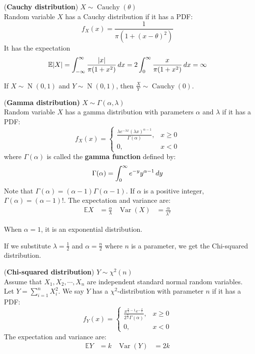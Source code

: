 \documentclass{huhtakm-template-book}
\newcommand{\expect}{\mathbb{E}}
\DeclareMathOperator{\N}{N}
\DeclareMathOperator{\Cauchy}{Cauchy}
\DeclareMathOperator{\Var}{Var}
\begin{document}
\newpage
\begin{eg}(\textbf{Cauchy distribution}) $X\sim\Cauchy(\theta)$\\
	Random variable $X$ has a Cauchy distribution if it has a PDF:
	\begin{equation*}
		f_{X}(x)=\frac{1}{\pi(1+(x-\theta)^{2})}
	\end{equation*}
	It has the expectation
	\begin{equation*}
		\expect|X|=\intinfty\frac{|x|}{\pi(1+x^{2})}\,dx=2\intlu{0}{\infty}\frac{x}{\pi(1+x^{2})}\,dx=\infty
	\end{equation*}
\end{eg}
\begin{rem}
	If $X\sim\N(0,1)$ and $Y\sim\N(0,1)$, then $\frac{X}{Y}\sim\Cauchy(0)$.
\end{rem}
\begin{eg}(\textbf{Gamma distribution)} $X\sim\Gamma(\alpha,\lambda)$\\
	Random variable $X$ has a gamma distribution with parameters $\alpha$ and $\lambda$ if it has a PDF:
	\begin{equation*}
		f_{X}(x)=\begin{cases}
			\frac{\lambda e^{-\lambda x}(\lambda x)^{\alpha-1}}{\Gamma(\alpha)}, &x\geq 0\\
			0, &x<0
		\end{cases}
	\end{equation*}
	where $\Gamma(\alpha)$ is called the \textbf{gamma function} defined by:
	\begin{equation*}
		\Gamma(\alpha)=\int_{0}^{\infty}e^{-y}y^{\alpha-1}\,dy
	\end{equation*}
	Note that $\Gamma(\alpha)=(\alpha-1)\Gamma(\alpha-1)$. If $\alpha$ is a positive integer, $\Gamma(\alpha)=(\alpha-1)!$. The expectation and variance are:
	\begin{align*}
		\expect{X}&=\frac{\alpha}{\lambda} & \Var(X)&=\frac{\alpha}{\lambda^{2}}
	\end{align*}
\end{eg}
\begin{rem}
	When $\alpha=1$, it is an exponential distribution.
\end{rem}
If we substitute $\lambda=\frac{1}{2}$ and $\alpha=\frac{n}{2}$ where $n$ is a parameter, we get the Chi-squared distribution.
\begin{eg}(\textbf{Chi-squared distribution}) $Y\sim\chi^{2}(n)$\\
	Assume that $X_{1},X_{2},\cdots,X_{n}$ are independent standard normal random variables. Let $Y=\sum_{i=1}^{n}X_{i}^{2}$. We say $Y$ has a $\chi^{2}$-distribution with parameter $n$ if it has a PDF:
	\begin{equation*}
		f_{Y}(x)=\begin{cases}
			\frac{x^{\frac{n}{2}-1}e^{-\frac{x}{2}}}{2^{\frac{n}{2}}\Gamma(\alpha)}, &x\geq 0\\
			0, &x<0
		\end{cases}
	\end{equation*}
	The expectation and variance are:
	\begin{align*}
		\expect{Y}&=k & \Var(Y)&=2k
	\end{align*}
\end{eg}
\end{document}
